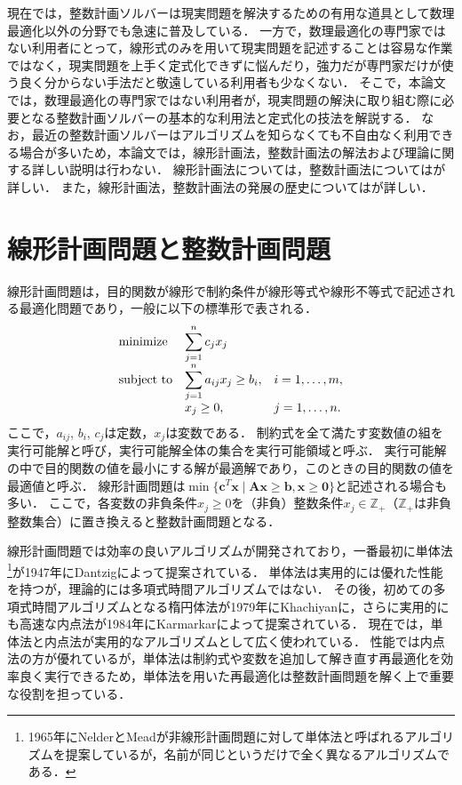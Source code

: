 \documentclass[japanese]{jnlp_1.4}
\begin{document}
現在では，整数計画ソルバーは現実問題を解決するための有用な道具として数理最適化以外の分野でも急速に普及している．
一方で，数理最適化の専門家ではない利用者にとって，線形式のみを用いて現実問題を記述することは容易な作業ではなく，現実問題を上手く定式化できずに悩んだり，強力だが専門家だけが使う良く分からない手法だと敬遠している利用者も少なくない．
そこで，本論文では，数理最適化の専門家ではない利用者が，現実問題の解決に取り組む際に必要となる整数計画ソルバーの基本的な利用法と定式化の技法を解説する．
なお，最近の整数計画ソルバーはアルゴリズムを知らなくても不自由なく利用できる場合が多いため，本論文では，線形計画法，整数計画法の解法および理論に関する詳しい説明は行わない．
線形計画法については\cite{ChvatalV1983,KonnoH1987}，整数計画法については\cite{KonnoH1982,NemhauserGL1988,WolseyLA1998}が詳しい．
また，線形計画法，整数計画法の発展の歴史については\cite{AchterbergT2013,AshfordR2007,BixbyR2007,KonnoH2005,KonnoH2014,LodiA2010}が詳しい．


\section{線形計画問題と整数計画問題}
\label{sec:fundamental}

線形計画問題は，目的関数が線形で制約条件が線形等式や線形不等式で記述される最適化問題であり，一般に以下の標準形で表される．
\begin{equation}
\begin{array}{lll}
\textnormal{minimize} & \displaystyle\sum_{j=1}^n c_j x_j &\\
\textnormal{subject to} & \displaystyle\sum_{j=1}^n a_{ij} x_j \ge b_i, & i=1,\dots,m,\\
& x_j \ge 0, & j=1,\dots,n.
\end{array}
\end{equation}
ここで，$a_{ij}$, $b_i$, $c_j$は定数，$x_j$は変数である．
制約式を全て満たす変数値の組を実行可能解と呼び，実行可能解全体の集合を実行可能領域と呼ぶ．
実行可能解の中で目的関数の値を最小にする解が最適解であり，このときの目的関数の値を最適値と呼ぶ．
線形計画問題は$\min\{ \bm{c}^T \bm{x} \mid \bm{A} \bm{x} \ge \bm{b}, \bm{x} \ge \bm{0} \}$と記述される場合も多い．
ここで，各変数の非負条件$x_j \ge 0$を（非負）整数条件$x_j \in \mathbb{Z}_+$（$\mathbb{Z}_+$は非負整数集合）に置き換えると整数計画問題となる．

線形計画問題では効率の良いアルゴリズムが開発されており，一番最初に単体法\footnote{1965年にNelderとMeadが非線形計画問題に対して単体法と呼ばれるアルゴリズムを提案しているが，名前が同じというだけで全く異なるアルゴリズムである．}が1947年にDantzigによって提案されている．
単体法は実用的には優れた性能を持つが，理論的には多項式時間アルゴリズムではない．
その後，初めての多項式時間アルゴリズムとなる楕円体法が1979年にKhachiyanに，さらに実用的にも高速な内点法が1984年にKarmarkarによって提案されている．
現在では，単体法と内点法が実用的なアルゴリズムとして広く使われている．
性能では内点法の方が優れているが，単体法は制約式や変数を追加して解き直す再最適化を効率良く実行できるため，単体法を用いた再最適化は整数計画問題を解く上で重要な役割を担っている．
\end{document}
